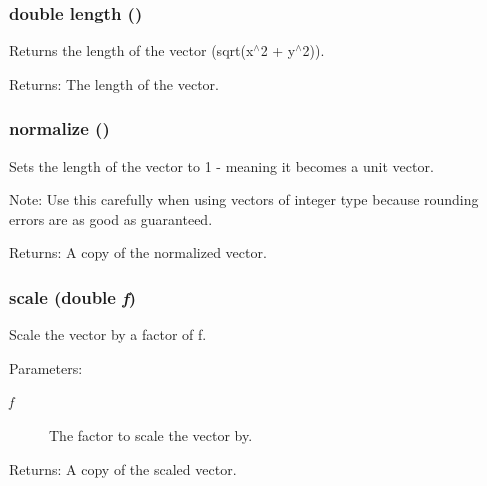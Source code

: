 \subsubsection{\setlength{\rightskip}{0pt plus 5cm}double length ()\hspace{0.3cm}{\tt  [inline]}}\label{classEngine_1_1Vector2_35b40d9678428ee6772554f8a60bd55d}


Returns the length of the vector (sqrt(x$^\wedge$2 + y$^\wedge$2)). \begin{Desc}
\item[Returns:]The length of the vector. \end{Desc}
\subsubsection{ normalize ()\hspace{0.3cm}{\tt  [inline]}}\label{classEngine_1_1Vector2_1c1dc5c85feb670f157d0c9c728ab042}


Sets the length of the vector to 1 - meaning it becomes a unit vector. \begin{Desc}
\item[Note:]Use this carefully when using vectors of integer type because rounding errors are as good as guaranteed. \end{Desc}
\begin{Desc}
\item[Returns:]A copy of the normalized vector. \end{Desc}
\subsubsection{ scale (double {\em f})\hspace{0.3cm}{\tt  [inline]}}\label{classEngine_1_1Vector2_ab2eed7309500689c78cfc2cec634374}


Scale the vector by a factor of f. \begin{Desc}
\item[Parameters:]
\begin{description}
\item[{\em f}]The factor to scale the vector by. \end{description}
\end{Desc}
\begin{Desc}
\item[Returns:]A copy of the scaled vector. \end{Desc}
